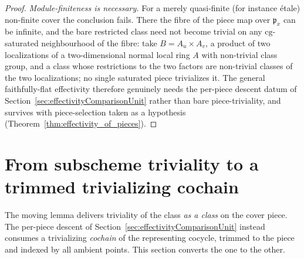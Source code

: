 \begin{proof}
  \emph{Module-finiteness is necessary.} For a merely quasi-finite (for instance \'etale) non-finite
  cover the conclusion fails. There the fibre of the piece map over \(\mathfrak p_x\) can be infinite,
  and the bare restricted class need not become trivial on any \(\mathrm{cg}\)-saturated neighbourhood
  of the fibre: take \(B = A_u \times A_v\), a product of two localizations of a two-dimensional
  normal local ring \(A\) with non-trivial class group, and a class whose restrictions to the two
  factors are non-trivial classes of the two localizations; no single saturated piece trivializes it.
  The general faithfully-flat effectivity therefore genuinely needs the per-piece descent datum of
  Section~\ref{sec:effectivityComparisonUnit} rather than bare piece-triviality, and survives with
  piece-selection taken as a hypothesis (Theorem~\ref{thm:effectivity_of_pieces}).
\end{proof}

\section{From subscheme triviality to a trimmed trivializing cochain}
\label{sec:effectivityTrivialization}

The moving lemma delivers triviality of the class \emph{as a class} on the cover piece. The per-piece
descent of Section~\ref{sec:effectivityComparisonUnit} instead consumes a trivializing \emph{cochain}
of the representing cocycle, trimmed to the piece and indexed by all ambient points. This section
converts the one to the other.

